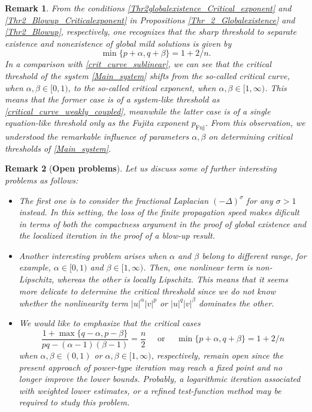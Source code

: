 \documentclass[11pt,reqno]{amsart}
\newtheorem{remark}{Remark}[section]
\begin{document}
	\begin{remark}
		{\rm
			From the conditions \eqref{Thr2globalexistence_Critical_exponent} and \eqref{Thr2_Blowup_Criticalexponent} in Propositions \ref{Thr_2_Globalexistence} and \ref{Thr2_Blowup}, respectively, one recognizes that the sharp threshold to separate existence and nonexistence of global mild solutions is given by 
			\begin{equation*}\label{Thr2_Criticalexponent}
				\min\{p+\alpha,q+\beta\}= 1+2/n.
			\end{equation*}
			In a comparison with \eqref{crit_curve_sublinear}, we can see that the critical threshold of the system \eqref{Main_system} shifts from the so-called critical curve, when $\alpha,\beta \in [0,1)$, to the so-called critical exponent, when $\alpha,\beta \in [1,\infty)$. This means that the former case is of a system-like threshold as \eqref{critical_curve_weakly_coupled}, meanwhile the latter case is of a single equation-like threshold only as the Fujita exponent $p_{\mathrm{Fuj}}$. From this observation, we understood the remarkable influence of parameters $\alpha,\beta$ on determining critical thresholds of \eqref{Main_system}.
		}
	\end{remark}
	
	\begin{remark}[\textbf{Open problems}]
		{\rm
			Let us discuss some of further interesting problems as follows:
			\begin{itemize}[leftmargin=*]
				\item[$\bullet$] The first one is to consider the fractional Laplacian $(-\Delta)^{\sigma}$ for any $\sigma>1$ instead. In this setting, the loss of the finite propagation speed makes dificult in terms of both the compactness argument in the proof of global existence and the localized iteration in the proof of a blow-up result.
				\item[$\bullet$] Another interesting problem arises when $\alpha$ and $\beta$ belong to different range, for example, $\alpha\in[0,1)$ and $\beta\in[1,\infty)$. Then, one nonlinear term is non-Lipschitz, whereas the other is locally Lipschitz. This means that it seems more delicate to determine the critical threshold since we do not know whether the nonlinearity term $|u|^{\alpha}|v|^{p}$ or $|u|^{q}|v|^{\beta}$ dominates the other.
				\item[$\bullet$] We would like to emphasize that the critical cases 
				\[
				\frac{1+\max\{q-\alpha,p-\beta\}}{pq-(\alpha-1)(\beta-1)}=\frac{n}{2} \quad\text{ or }\quad \min\{p+\alpha,q+\beta\}=1+2/n
				\]
				when $\alpha,\beta\in (0,1)$ or $\alpha,\beta\in [1,\infty)$, respectively, remain open since the present approach of power-type iteration may reach a fixed point and no longer improve the lower bounds. Probably, a logarithmic iteration associated with weighted lower estimates, or a refined test-function method may be required to study this problem.
			\end{itemize}
		}
	\end{remark}
	
\end{document}
